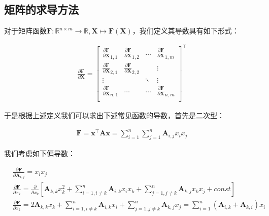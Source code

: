 \documentclass[UTF8]{book}
\begin{document}
\subsection{矩阵的求导方法}
对于矩阵函数$\mathbf{F}: \mathbb{R}^{n\times m} \rightarrow \mathbb{R}, \mathbf{X} \mapsto \mathbf{F}(\mathbf{X})$，我们定义其导数具有如下形式：
\begin{large}
    \begin{equation}
        \begin{aligned}
            \frac{\partial \mathbf{F}}{\partial \mathbf{X}} = \begin{bmatrix}
            \frac{\partial \mathbf{F}}{\partial \mathbf{X}}_{1,1} & \frac{\partial \mathbf{F}}{\partial \mathbf{X}}_{1,2} & \dots & \frac{\partial \mathbf{F}}{\partial \mathbf{X}}_{1,m}\\
            \frac{\partial \mathbf{F}}{\partial \mathbf{X}}_{2,1} & \frac{\partial \mathbf{F}}{\partial \mathbf{X}}_{2,2}  &  & \vdots \\
            \vdots  &  & \ddots & \vdots \\
            \frac{\partial \mathbf{F}}{\partial \mathbf{X}}_{n,1} & \dots & \dots & \frac{\partial \mathbf{F}}{\partial \mathbf{X}}_{n,m} \\
            \end{bmatrix}^\top
            \nonumber
        \end{aligned}
    \end{equation}
\end{large}
于是根据上述定义我们可以求出下述常见函数的导数，首先是二次型：
\begin{large}
    \begin{equation}
        \begin{aligned}
            \mathbf{F}=\mathbf{x}^\top\mathbf{A}\mathbf{x}=\sum_{i=1}^{n}\sum_{j=1}^{n}\mathbf{A}_{i,j}x_ix_j
            \nonumber
        \end{aligned}
    \end{equation}
\end{large}
我们考虑如下偏导数：
\begin{large}
    \begin{equation}
        \begin{aligned}
            &\frac{\partial \mathbf{F}}{\partial \mathbf{A}_{i,j}}=x_ix_j \\
            &\frac{\partial \mathbf{F}}{\partial x_k}=\frac{\partial}{\partial x_k} \left[ \mathbf{A}_{k,k}x_k^2 + \sum_{i=1,i\not = k}^{n}\mathbf{A}_{i,k}x_ix_k + \sum_{j=1,j\not = k}^{n}\mathbf{A}_{k,j}x_kx_j + const \right] \\
            &\frac{\partial \mathbf{F}}{\partial x_k}=2\mathbf{A}_{k,k}x_k + \sum_{i=1,i\not = k}^{n}\mathbf{A}_{i,k}x_i + \sum_{j=1,j\not = k}^{n}\mathbf{A}_{k,j}x_j = \sum_{i=1}^{n}\left( \mathbf{A}_{i,k} + \mathbf{A}_{k,i} \right)x_i \\
            \nonumber
        \end{aligned}
    \end{equation}
\end{large}
\end{document}
